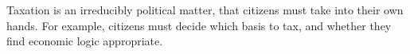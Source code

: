 Taxation is an irreducibly political matter, that citizens must take into their own hands. For example, citizens must decide which basis to tax, and whether they find economic logic appropriate.
